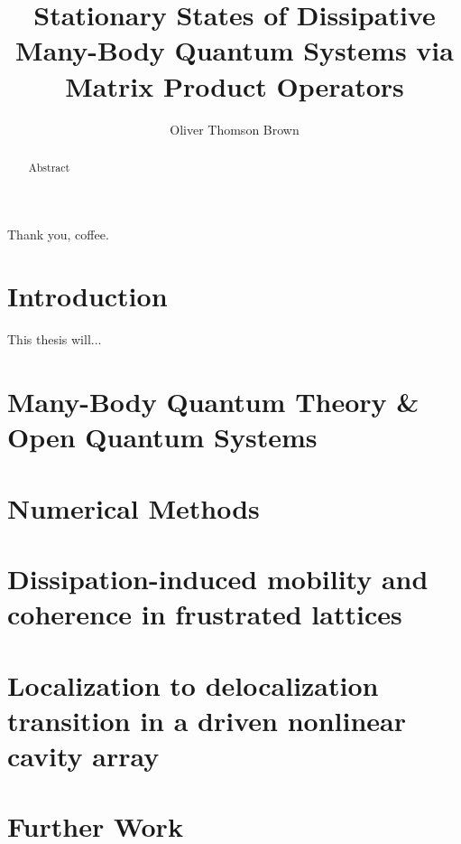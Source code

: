 \documentclass[a4paper,oneside,12pt]{hwthesis}
\author{Oliver Thomson Brown}
\title{Stationary States of Dissipative Many-Body Quantum Systems via Matrix Product Operators}
\newcommand*{\chappath}{../../include/chapters}
\newcommand*{\refpath}{../../include/refs}
\begin{document}
\maketitle


\begin{acknowledgements}
Thank you, coffee.
\end{acknowledgements}

\begin{abstract}
Abstract
\end{abstract}

\tableofcontents

\chapter{Introduction}
\setcounter{page}{1}

This thesis will...

\chapter[MBQT \& OQS]{Many-Body Quantum Theory \& Open Quantum Systems}


\chapter{Numerical Methods}



\chapter[Frustrated lattices]{Dissipation-induced mobility and coherence in frustrated lattices}



\chapter[Driven nonlinear cavity array]{Localization to delocalization transition in a driven nonlinear cavity array}

\chapter{Further Work}



\end{document}
